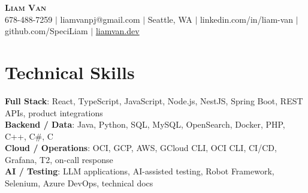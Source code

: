 \documentclass[letterpaper,11pt]{article}
\begin{document}

%
\begin{center}
    \textbf{\Huge \scshape Liam Van} \\ \vspace{1pt}
    \small 678-488-7259 $|$ \small {liamvanpj@gmail.com} $|$ Seattle, WA
 {{$|$ linkedin.com/in/liam-van} {$|$ github.com/SpeciLiam} {$|$ \href{https://liamvan.dev}{liamvan.dev}}}

\end{center}

\section{Technical Skills}
 \begin{itemize}[leftmargin=0.15in, label={}]
    \small{\item{
     \textbf{Full Stack}{: React, TypeScript, JavaScript, Node.js, NestJS, Spring Boot, REST APIs, product integrations} \\
     \textbf{Backend / Data}{: Java, Python, SQL, MySQL, OpenSearch, Docker, PHP, C++, C\#, C} \\
     \textbf{Cloud / Operations}{: OCI, GCP, AWS, GCloud CLI, OCI CLI, CI/CD, Grafana, T2, on-call response} \\
     \textbf{AI / Testing}{: LLM applications, AI-assisted testing, Robot Framework, Selenium, Azure DevOps, technical docs} \\
    }}
 \end{itemize}
%

\end{document}
